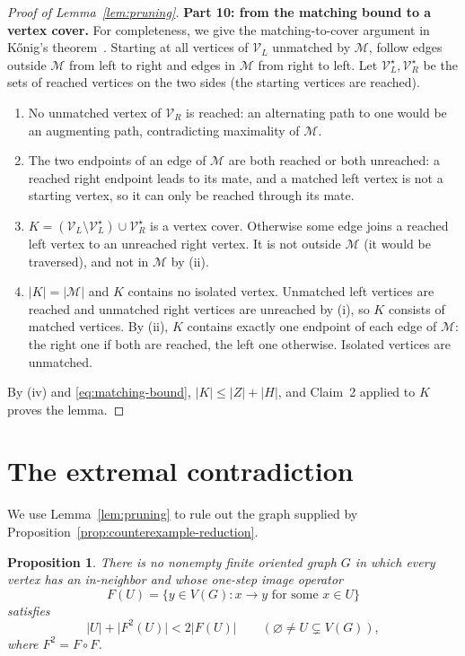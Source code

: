\documentclass[11pt]{article}
\newtheorem{proposition}[theorem]{Proposition}
\theoremstyle{remark}
\newcommand{\abs}[1]{\lvert #1\rvert}
\newcommand{\Step}[1]{\par\medskip\noindent\textbf{#1}\enspace}
\newcommand{\cM}{\mathcal M}
\newcommand{\cV}{\mathcal V}
\begin{document}
\begin{proof}[Proof of Lemma~\ref{lem:pruning}]
\Step{Part 10: from the matching bound to a vertex cover.}
For completeness, we give the matching-to-cover argument in
K\H{o}nig's theorem~\cite{konig1931}. Starting at all vertices of
$\cV_L$ unmatched by $\cM$, follow edges outside $\mathcal M$ from left to
right and edges in $\mathcal M$ from right to left. Let
$\cV_L^{\star},\cV_R^{\star}$ be the sets of reached vertices on the two
sides (the starting vertices are reached).
\begin{enumerate}[label=(\roman*),leftmargin=2.2em]
\item No unmatched vertex of $\cV_R$ is reached: an alternating path to one
would be an augmenting path, contradicting maximality of $\cM$.
\item The two endpoints of an edge of $\cM$ are both reached or both
unreached: a reached right endpoint leads to its mate, and a matched left
vertex is not a starting vertex, so it can only be reached through its
mate.
\item $K=(\mathcal V_L\setminus \cV_L^{\star})\cup \cV_R^{\star}$ is a vertex
cover. Otherwise some edge joins a reached left vertex to an unreached
right vertex. It is not outside $\cM$ (it would be traversed), and not in
$\cM$ by (ii).
\item $\abs K=\abs\cM$ and $K$ contains no isolated vertex. Unmatched left
vertices are reached and unmatched right vertices are unreached by (i), so
$K$ consists of matched vertices. By (ii), $K$ contains exactly one endpoint
of each edge of $\cM$: the right one if both are reached, the left one
otherwise. Isolated vertices are unmatched.
\end{enumerate}
By (iv) and \eqref{eq:matching-bound}, $\abs K\le\abs Z+\abs H$, and Claim~2
applied to $K$ proves the lemma.
\end{proof}

\section{The extremal contradiction}\label{sec:incompatibility}

We use Lemma~\ref{lem:pruning} to rule out the graph supplied by
Proposition~\ref{prop:counterexample-reduction}.

\begin{proposition}\label{prop:no-concavity}
There is no nonempty finite oriented graph $G$ in which every vertex has an
in-neighbor and whose one-step image operator
\[
 F(U)=\{y\in V(G):x\to y\text{ for some }x\in U\}
\]
satisfies
\begin{equation}\label{eq:impossible-concavity}
 \abs{U}+\abs{F^2(U)}<2\abs{F(U)}
 \qquad(\varnothing\ne U\subsetneq V(G)),
\end{equation}
where $F^2=F\circ F$.
\end{proposition}
\end{document}
